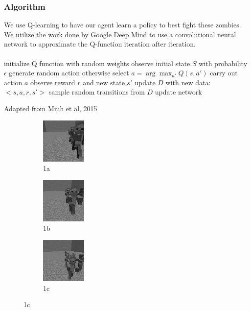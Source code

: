 \documentclass{article}
\begin{document}
\begin{multicols}{2}
\subsubsection{Algorithm}

We use Q-learning to have our agent learn a policy to best fight these zombies.
We utilize the work done by Google Deep Mind to use a convolutional neural network to approximate the Q-function iteration after iteration.
\paragraph{}


\begin{algorithm*}[H]
     \SetAlgoLined
     initialize Q function with random weights \;
     observe initial state $S$ \;
      {
        with probability $\epsilon$ generate random action \;
        otherwise select $a = \arg\max_{a'} Q(s,a')$ \;
        carry out action $a$ \;
        observe reward $r$ and new state $s'$ \;
        update $D$ with new data: $<s,a,r,s'>$ \;
        sample random transitions from $D$ \;
        update network \;
     }
     \caption{Adapted from Mnih et al, 2015}
\end{algorithm*}

\begin{figure}[H]
\caption{Images of processed features}
\begin{subfigure}{.25\textwidth}
  \centering
  \includegraphics[scale=1.0]{./messigray1.png}
  \caption{1a}
  \label{fig:sfig1}
\end{subfigure}%
\begin{subfigure}{.25\textwidth}
  \centering
  \includegraphics[scale=1.0]{./messigray2.png}
  \caption{1b}
  \label{fig:sfig2}
\end{subfigure}
\begin{subfigure}{.25\textwidth}
  \centering
  \includegraphics[scale=1.0]{./messigray3.png}
  \caption{1c}
  \label{fig:sfig3}
\end{subfigure}
\label{fig:fig}
\end{figure}




\end{multicols}
\end{document}
